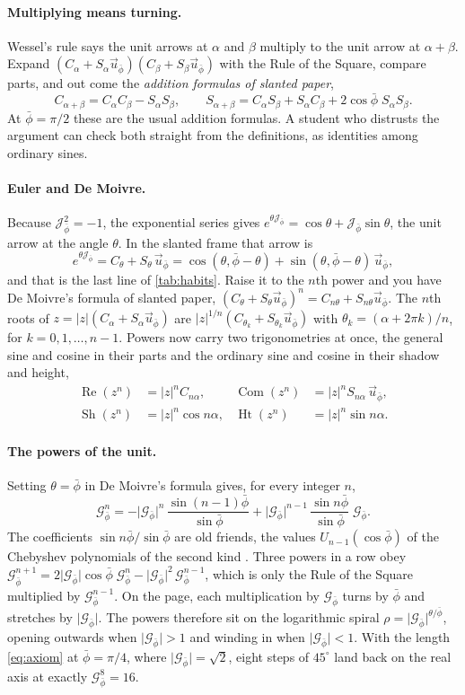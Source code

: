 \documentclass[11pt,a4paper]{article}
\theoremstyle{plain}
\theoremstyle{definition}
\newcommand{\pb}{\bar{\phi}}                     %
\newcommand{\Gp}{\mathcal{G}_{\bar{\phi}}}       %
\newcommand{\up}{\vec{u}_{\bar{\phi}}}           %
\newcommand{\Jp}{\mathcal{J}_{\bar{\phi}}}       %
\newcommand{\G}{\lvert\Gp\rvert}                 %
\renewcommand{\Re}{\operatorname{Re}}
\DeclareMathOperator{\Com}{Com}
\DeclareMathOperator{\Sh}{Sh}
\DeclareMathOperator{\Ht}{Ht}
\begin{document}
\paragraph{Multiplying means turning.} Wessel's rule says the unit arrows at $\alpha$ and $\beta$ multiply to the unit arrow at $\alpha + \beta$. Expand $(C_\alpha + S_\alpha\up)(C_\beta + S_\beta\up)$ with the Rule of the Square, compare parts, and out come the \emph{addition formulas of slanted paper},
\[
C_{\alpha + \beta} = C_\alpha C_\beta - S_\alpha S_\beta , \qquad S_{\alpha + \beta} = C_\alpha S_\beta + S_\alpha C_\beta + 2\cos\pb\;S_\alpha S_\beta .
\]
At $\pb = \pi/2$ these are the usual addition formulas. A student who distrusts the argument can check both straight from the definitions, as identities among ordinary sines.

\paragraph{Euler and De Moivre.} Because $\Jp^2 = -1$, the exponential series gives $e^{\theta\Jp} = \cos\theta + \Jp\sin\theta$, the unit arrow at the angle $\theta$. In the slanted frame that arrow is
\[
e^{\theta\Jp} = C_\theta + S_\theta\,\up = \cos(\theta, \pb - \theta) + \sin(\theta, \pb - \theta)\,\up ,
\]
and that is the last line of \cref{tab:habits}. Raise it to the $n$th power and you have De Moivre's formula of slanted paper, $(C_\theta + S_\theta\up)^n = C_{n\theta} + S_{n\theta}\up$. The $n$th roots of $z = \lvert z\rvert(C_\alpha + S_\alpha\up)$ are $\lvert z\rvert^{1/n}(C_{\theta_k} + S_{\theta_k}\up)$ with $\theta_k = (\alpha + 2\pi k)/n$, for $k = 0, 1, \dots, n - 1$. Powers now carry two trigonometries at once, the general sine and cosine in their parts and the ordinary sine and cosine in their shadow and height,
\begin{align*}
\Re(z^n) &= \lvert z\rvert^n C_{n\alpha} , & \Com(z^n) &= \lvert z\rvert^n S_{n\alpha}\,\up , \\
\Sh(z^n) &= \lvert z\rvert^n\cos n\alpha , & \Ht(z^n) &= \lvert z\rvert^n\sin n\alpha .
\end{align*}

\paragraph{The powers of the unit.} Setting $\theta = \pb$ in De Moivre's formula gives, for every integer $n$,
\[
\Gp^n = -\G^n\,\frac{\sin(n - 1)\pb}{\sin\pb} + \G^{n-1}\,\frac{\sin n\pb}{\sin\pb}\;\Gp .
\]
The coefficients $\sin n\pb/\sin\pb$ are old friends, the values $U_{n-1}(\cos\pb)$ of the Chebyshev polynomials of the second kind \cite{MasonHandscomb}. Three powers in a row obey $\Gp^{n+1} = 2\G\cos\pb\;\Gp^n - \G^2\,\Gp^{n-1}$, which is only the Rule of the Square multiplied by $\Gp^{n-1}$. On the page, each multiplication by $\Gp$ turns by $\pb$ and stretches by $\G$. The powers therefore sit on the logarithmic spiral $\rho = \G^{\theta/\pb}$, opening outwards when $\G > 1$ and winding in when $\G < 1$. With the length \eqref{eq:axiom} at $\pb = \pi/4$, where $\G = \sqrt{2}$, eight steps of $45^\circ$ land back on the real axis at exactly $\Gp^8 = 16$.
\end{document}
